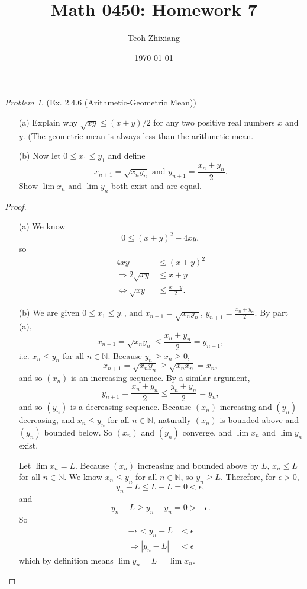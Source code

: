 \documentclass[11pt,twoside, reqno]{amsart}
\theoremstyle{remark}
\newtheorem{Prob}{Problem}
\def\N{\mathbb N}
\renewcommand{\implies}{\Rightarrow}
\renewcommand{\iff}{\Leftrightarrow}
\begin{document}
\title{Math 0450: Homework 7}
\date{\today}
\author{Teoh Zhixiang}

\maketitle

\begin{Prob}(Ex. 2.4.6 (Arithmetic-Geometric Mean))
\begin{enumerate}
    \item [(a)] Explain why $\sqrt{xy} \leq (x+y)/2$ for any two positive real numbers $x$ and $y$. (The geometric mean is always less than the arithmetic mean.
    \item [(b)] Now let $0 \leq x_1 \leq y_1$ and define
    $$
        x_{n+1} = \sqrt{x_ny_n} \text{ and } y_{n+1} = \frac{x_n+y_n}{2}.
    $$
    Show $\lim x_n$ and $\lim y_n$ both exist and are equal.
\end{enumerate}
\end{Prob}

\begin{proof}
\begin{enumerate}
    \item [(a)] We know
    $$
        0 \leq (x+y)^2 - 4xy,
    $$
    so 
    \begin{align*}
        4xy &\leq (x+y)^2\\
        \implies 2\sqrt{xy} &\leq x+y\\
        \iff \sqrt{xy} &\leq \frac{x+y}{2}.
    \end{align*}
    \item [(b)] We are given $0 \leq x_1 \leq y_1$, and $x_{n+1} = \sqrt{x_ny_n}$, $y_{n+1} = \frac{x_n+y_n}{2}$. By part (a),
    $$
        x_{n+1} = \sqrt{x_ny_n} \leq \frac{x_n + y_n}{2} = y_{n+1},
    $$
    i.e. $x_n \leq y_n$ for all $n \in \N$. Because $y_n \geq x_n \geq 0$,
    $$
        x_{n+1} = \sqrt{x_ny_n} \geq \sqrt{x_nx_n} = x_n,
    $$
    and so $(x_n)$ is an increasing sequence. By a similar argument,
    $$
        y_{n+1} = \frac{x_n+y_n}{2} \leq \frac{y_n+y_n}{2} = y_n,
    $$
    and so $(y_n)$ is a decreasing sequence. Because $(x_n)$ increasing and $(y_n)$ decreasing, and $x_n \leq y_n$ for all $n \in \N$, naturally $(x_n)$ is bounded above and $(y_n)$ bounded below. So $(x_n)$ and $(y_n)$ converge, and $\lim x_n$ and $\lim y_n$ exist.
    
    Let $\lim x_n = L$. Because $(x_n)$ increasing and bounded above by $L$, $x_n \leq L$ for all $n \in \N$. We know $x_n \leq y_n$ for all $n \in \N$, so $y_n \geq L$. Therefore, for $\epsilon > 0$,
    $$
        y_n - L \leq L-L = 0 < \epsilon,
    $$
    and
    $$
        y_n - L \geq y_n - y_n = 0 > -\epsilon.
    $$
    So
    \begin{align*}
        -\epsilon < y_n - L &< \epsilon \\
        \implies |y_n - L| &< \epsilon
    \end{align*}
    which by definition means $\lim y_n = L = \lim x_n$.
\end{enumerate}
\end{proof}
\end{document}
